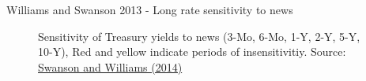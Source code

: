\begin{frame}{Williams and Swanson 2013 - Long rate sensitivity to news}

\begin{figure}
\begin{center}


\end{center}
\caption{Sensitivity of Treasury yields to news (3-Mo, 6-Mo, 1-Y, 2-Y, 5-Y, 10-Y), Red and yellow indicate periods of insensitivitiy. Source: \href{https://pubs.aeaweb.org/doi/pdfplus/10.1257/aer.104.10.3154}{Swanson and Williams (2014)}}
\end{figure}

\end{frame}


	
